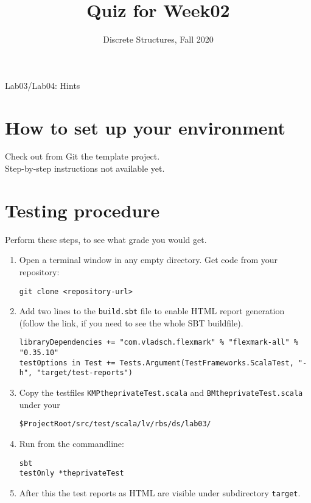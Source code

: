 \documentclass[jou]{apa6}
\title{Quiz for Week02}
\author{Discrete Structures, Fall 2020}
\affiliation{RBS}
\begin{document}

{\Large Lab03/Lab04: Hints}

\thispagestyle{empty}

\section{How to set up your environment}

Check out from Git the template project.\\
Step-by-step instructions not available yet.

\section{Testing procedure}

Perform these steps, to see what grade you would get.

\begin{enumerate}
\item Open a terminal window in any empty directory. Get code from your repository:
\begin{verbatim}
git clone <repository-url>
\end{verbatim}
\item Add two lines to the {\tt build.sbt} file \textendash{} to enable HTML report generation 
(follow the link, if you need to see the whole SBT buildfile). 
{\footnotesize
\begin{verbatim}
libraryDependencies += "com.vladsch.flexmark" % "flexmark-all" % "0.35.10"
testOptions in Test += Tests.Argument(TestFrameworks.ScalaTest, "-h", "target/test-reports")
\end{verbatim}
}
\item Copy the testfiles {\tt KMPtheprivateTest.scala} and {\tt BMtheprivateTest.scala} under your 
\begin{verbatim}
$ProjectRoot/src/test/scala/lv/rbs/ds/lab03/ 
\end{verbatim}
\item Run from the commandline: 
\begin{verbatim}
sbt
testOnly *theprivateTest
\end{verbatim}
\item After this the test reports as HTML are visible under subdirectory {\tt target}.
\end{enumerate}
\end{document}
